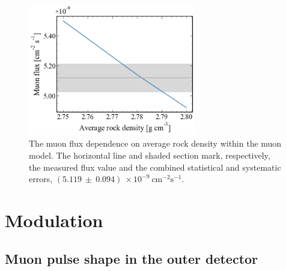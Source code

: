 \begin{figure}[htbp]
    \centering
    \includegraphics[width=0.65\textwidth]{figures/Muons/Flux_density_ws22_ws24.pdf}
    \caption{The muon flux dependence on average rock density within the muon model. The horizontal line and shaded section mark, respectively, the measured flux value and the combined statistical and systematic errors, $(5.119~\pm~0.094)~\times10^{-9}~\textrm{cm}^{-2}\textrm{s}^{-1}$.}
    \label{fig:Muons/flux_density}
\end{figure}


\section{Modulation}\label{sec:Muons/MuonModulation}
\subsection{Muon pulse shape in the outer detector}\label{sec:Muons/MuonModulationODPulseShape}

